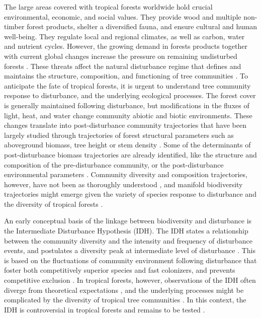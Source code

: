 \documentclass[fleqn,10pt]{ArtEcoFoG} %
\theoremstyle{definition}
\theoremstyle{definition}
\theoremstyle{definition}
\theoremstyle{remark}
\begin{document}
The large areas covered with tropical forests worldwide hold crucial
environmental, economic, and social values. They provide wood and
multiple non-timber forest products, shelter a diversified fauna, and
ensure cultural and human well-being. They regulate local and regional
climates, as well as carbon, water and nutrient cycles. However, the
growing demand in forests products together with current global changes
increase the pressure on remaining undisturbed forests
\citep{Morales-Hidalgo2015}. These threats affect the natural
disturbance regime that defines and maintains the structure,
composition, and functioning of tree communities
\citep{Schnitzer2001, Anderson-Teixeira2013, Sist2015}. To anticipate
the fate of tropical forests, it is urgent to understand tree community
response to disturbance, and the underlying ecological processes. The
forest cover is generally maintained following disturbance, but
modifications in the fluxes of light, heat, and water
\citep{Goulamoussene2017} change community abiotic and biotic
environments. These changes translate into post-disturbance community
trajectories that have been largely studied through trajectories of
forest structural parameters such as aboveground biomass, tree height or
stem density \citep{Piponiot2016, Rutishauser2016}. Some of the
determinants of post-disturbance biomass trajectories are already
identified, like the structure and composition of the pre-disturbance
community, or the post-disturbance environmental parameters
\citep{Herault2018}. Community diversity and composition trajectories,
however, have not been as thoroughly understood
\citep{Guitet2018, Molino2001}, and manifold biodiversity trajectories
might emerge given the variety of species response to disturbance and
the diversity of tropical forests
\citep{Lindenmayer2012, Garcia_florez2017}.

An early conceptual basis of the linkage between biodiversity and
disturbance is the Intermediate Disturbance Hypothesis (IDH). The IDH
states a relationship between the community diversity and the intensity
and frequency of disturbance events, and postulates a diversity peak at
intermediate level of disturbance \citep{Connell1978}. This is based on
the fluctuations of community environment following disturbance that
foster both competitively superior species and fast colonizers, and
prevents competitive exclusion \citep{Shea2004, Pulsford2016}. In
tropical forests, however, observations of the IDH often diverge from
theoretical expectations \citep{Hugues2007, Sheil2003, Norden2017}, and
the underlying processes might be complicated by the diversity of
tropical tree communities \citep{Lindenmayer2012, Garcia_florez2017}. In
this context, the IDH is controversial in tropical forests and remains
to be tested \citep{Hubbell2001, Fox2013, Sheil2013}.
\end{document}
